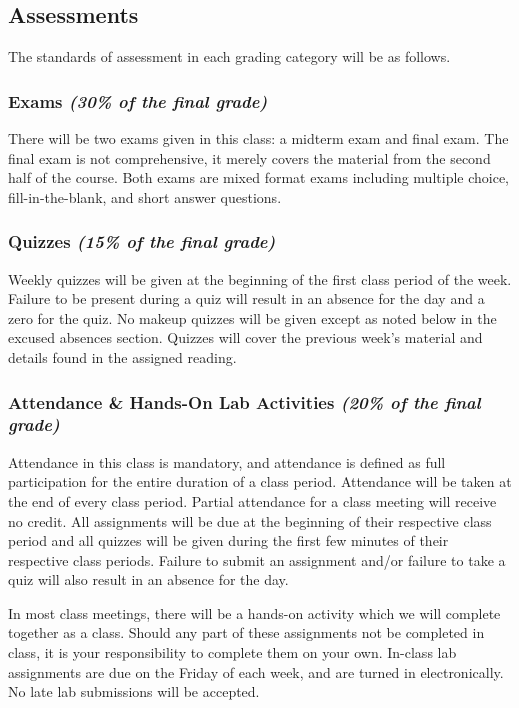 \documentclass[11pt]{article}
\begin{document}
\subsection*{Assessments}
The standards of assessment in each grading category will be as
follows.

\subsubsection*{Exams {\em (30\% of the final grade)}}
There will be two exams given in this class: a midterm exam and final
exam.  The final exam is not comprehensive, it merely covers the
material from the second half of the course. Both exams are mixed
format exams including multiple choice, fill-in-the-blank, and short
answer questions.

\subsubsection*{Quizzes {\em (15\% of the final grade)}}
Weekly quizzes will be given at
the beginning of the first class period of the week.  Failure to be present
during a quiz will result in an absence for the day and a zero for
the quiz. No makeup quizzes will be given except as noted below in
the excused absences section. Quizzes will cover the previous week's
material and details found in the assigned reading.

\subsubsection*{Attendance \& Hands-On Lab Activities {\em (20\% of the final grade)}}
Attendance in this class is
mandatory, and attendance is defined as full participation for the
entire duration of a class period. Attendance will be taken at the
end of every class period. Partial attendance for a class meeting
will receive no credit. All assignments will be due at the beginning of their 
respective class period and all
quizzes will be given during the first few minutes of their respective
class periods. Failure to submit an assignment and/or failure to take
a quiz will also result in an absence for the day.

In most class meetings, there will be a hands-on activity which we
will complete together as a class.  Should any part of these assignments
not be completed in class, it is your responsibility to complete them
on your own.  In-class lab assignments are due on the Friday of each
week, and are turned in electronically.  No late lab submissions will
be accepted.
\end{document}
